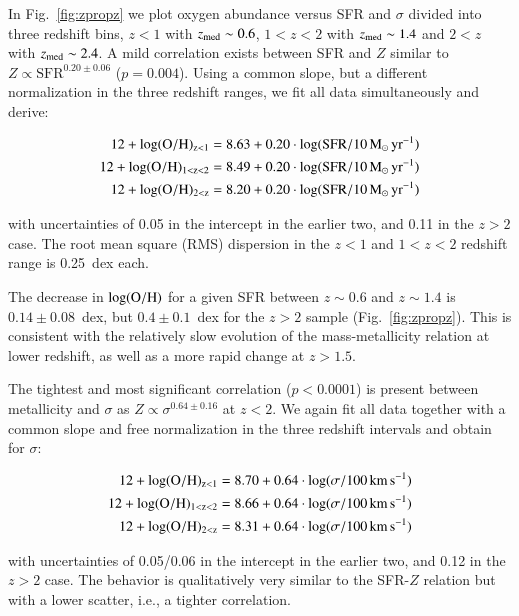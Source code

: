 \documentclass[traditabstract, longauth]{aa}
\newcommand{\oh}{12+\log(\rm{O/H})}
\begin{document}
In Fig.~\ref{fig:zpropz} we plot oxygen abundance versus SFR and $\sigma$ divided into three redshift bins, $z<1$ with $z_{\rm{med}}\sim0.6$, $1<z<2$ with $z_{\rm{med}}\sim1.4$ and $2<z$ with $z_{\rm{med}}\sim2.4$. A mild correlation exists between SFR and $Z$ similar to $Z\propto\mathrm{SFR}^{0.20\pm0.06}$ ($p=0.004$). Using a common slope, but a different normalization in the three redshift ranges, we fit all data simultaneously and derive:

\begin{equation}
\label{eq:ohsfr}
\begin{split}
\oh_{z<1} = 8.63 + 0.20\cdot \log(\rm{SFR/10\,M_\odot\,yr^{-1}}) \\
\oh_{1<z<2} = 8.49 + 0.20\cdot \log(\rm{SFR/10\,M_\odot\,yr^{-1}})  \\
\oh_{2<z} = 8.20 + 0.20\cdot \log(\rm{SFR/10\,M_\odot\,yr^{-1}})  \\
\end{split}
\end{equation}

 {with uncertainties of 0.05 in the intercept in the earlier two, and 0.11 in the $z>2$ case. The root mean square (RMS) dispersion in the $z<1$ and $1<z<2$ redshift range is 0.25~dex each.}

The decrease in $\log(\rm{O/H})$ for a given SFR between $z\sim0.6$ and $z\sim1.4$ is $0.14\pm0.08$~dex, but $0.4\pm0.1$~dex for the $z > 2$ sample (Fig.~\ref{fig:zpropz}). This is consistent with the relatively slow evolution of the mass-metallicity relation at lower redshift, as well as a more rapid change at $z > 1.5$. 

The tightest and most significant correlation ($p<0.0001$) is present between metallicity and $\sigma$ as $Z\propto\sigma^{0.64\pm0.16}$ at $z<2$. We again fit all data together with a common slope and free normalization in the three redshift intervals and obtain for $\sigma$:

\begin{equation}
\label{eq:ohsigma}
\begin{split}
\oh_{z<1} = 8.70 + 0.64\cdot \log(\sigma/\rm{100\,km\,s^{-1}}) \\
\oh_{1<z<2} = 8.66 + 0.64\cdot \log(\sigma/\rm{100\,km\,s^{-1}}) \\
\oh_{2<z} = 8.31 + 0.64\cdot \log(\sigma/\rm{100\,km\,s^{-1}})
\end{split}
\end{equation}

with uncertainties of 0.05/0.06 in the intercept in the earlier two, and 0.12 in the $z>2$ case. The behavior is qualitatively very similar to the SFR-$Z$ relation but with a lower scatter, i.e., a tighter correlation. 
\end{document}
